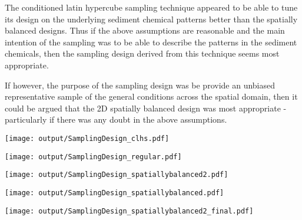 \documentclass[a4paper]{article}
\let\origfigure=\figure
\let\endorigfigure=\endfigure
\renewenvironment{figure}[1][]{%
   \origfigure[H]
}{%
   \endorigfigure
}
\begin{document}
The conditioned latin hypercube sampling technique appeared to be able
to tune its design on the underlying sediment chemical patterns better
than the spatially balanced designs. Thus if the above assumptions are
reasonable and the main intention of the sampling was to be able to
describe the patterns in the sediment chemicals, then the sampling
design derived from this technique seems most appropriate.

If however, the purpose of the sampling design was be provide an
unbiased representative sample of the general conditions across the
spatial domain, then it could be argued that the 2D spatially balanced
design was most appropriate - particularly if there was any doubt in the
above assumptions.

\begin{figure}
\centering\scriptsize
\texttt{[image: output/SamplingDesign\_clhs.pdf]}
\caption{Sampling configurations associated with the lowest mean Error
for each sample size for cLHS for the East
Arm\label{fig:SamplingDesign_clhs}}
\end{figure}

\begin{figure}
\centering\scriptsize
\texttt{[image: output/SamplingDesign\_regular.pdf]}
\caption{Sampling configurations associated with the lowest mean Error
for each sample size for Regular grid sampling for the East
Arm\label{fig:SamplingDesign_regular}}
\end{figure}

\begin{figure}
\centering\scriptsize
\texttt{[image: output/SamplingDesign\_spatiallybalanced2.pdf]}
\caption{Sampling configurations associated with the lowest mean Error
for each sample size for nD Spatially balanced sampling for the East
Arm\label{fig:SamplingDesignspatiallybalanced2}}
\end{figure}

\begin{figure}
\centering\scriptsize
\texttt{[image: output/SamplingDesign\_spatiallybalanced.pdf]}
\caption{Sampling configurations associated with the lowest mean Error
for each sample size for 2D Spatially balanced sampling for the East
Arm\label{fig:SamplingDesignspatiallybalanced}}
\end{figure}

\begin{figure}
\centering\scriptsize
\texttt{[image: output/SamplingDesign\_spatiallybalanced2\_final.pdf]}
\caption{Two dimensional spatially balanced sampling configuration for
the East Arm (100
samples)\label{fig:SamplingDesign_spatiallybalanced2_final}}
\end{figure}
\end{document}
